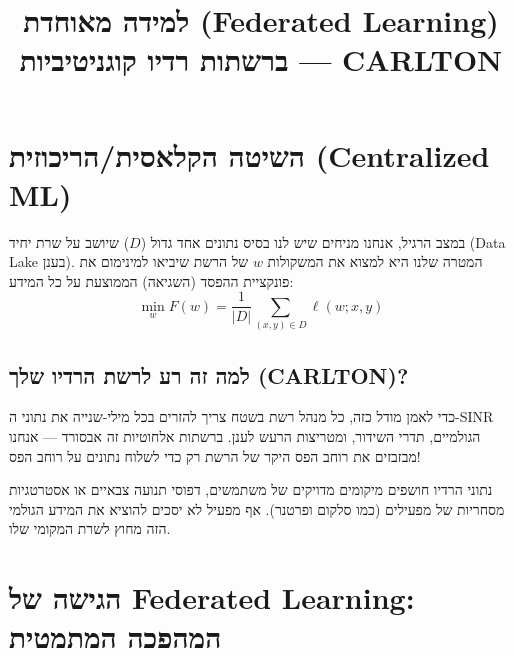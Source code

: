 \documentclass[11pt,a4paper]{article}
\title{למידה מאוחדת (Federated Learning) ברשתות רדיו קוגניטיביות --- CARLTON}
\author{}
\date{}
\newcommand{\loss}{\ell}
\begin{document}
\maketitle
\tableofcontents
\newpage

\section{השיטה הקלאסית/הריכוזית (Centralized ML)}

במצב הרגיל, אנחנו מניחים שיש לנו בסיס נתונים אחד גדול ($D$) שיושב על שרת יחיד (Data Lake בענן).
המטרה שלנו היא למצוא את המשקולות $w$ של הרשת שיביאו למינימום את פונקציית ההפסד (השגיאה) הממוצעת על כל המידע:
\begin{equation}
  \min_{w} F(w) = \frac{1}{|D|} \sum_{(x,y) \in D} \loss(w; x, y)
  \label{eq:centralized}
\end{equation}

\subsection{למה זה רע לרשת הרדיו שלך (CARLTON)?}

\begin{description}[style=nextline, leftmargin=2.5cm, labelwidth=2.2cm]
  \item[\textbf{רוחב פס מטורף (Bandwidth)}]
    כדי לאמן מודל כזה, כל מנהל רשת בשטח צריך להזרים בכל מילי-שנייה את נתוני ה-SINR הגולמיים, תדרי השידור, ומטריצות הרעש לענן.
    ברשתות אלחוטיות זה אבסורד --- אנחנו מבזבזים את רוחב הפס היקר של הרשת רק כדי לשלוח נתונים על רוחב הפס!

  \item[\textbf{אבטחה ופרטיות (Privacy)}]
    נתוני הרדיו חושפים מיקומים מדויקים של משתמשים, דפוסי תנועה צבאיים או אסטרטגיות מסחריות של מפעילים (כמו סלקום ופרטנר).
    אף מפעיל לא יסכים להוציא את המידע הגולמי הזה מחוץ לשרת המקומי שלו.
\end{description}

\section{הגישה של Federated Learning: המהפכה המתמטית}
\end{document}

